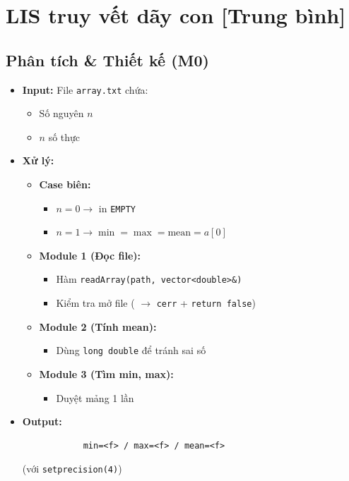 \section{LIS truy vết dãy con [Trung bình]}
\subsection{Phân tích \& Thiết kế (M0)}
    \begin{itemize}
    \item \textbf{Input:}
    File \texttt{array.txt} chứa:
    \begin{itemize}
        \item Số nguyên $n$
        \item $n$ số thực
    \end{itemize}

    \item \textbf{Xử lý:}
        \begin{itemize}
            \item \textbf{Case biên:}
            \begin{itemize}
                \item $n = 0 \rightarrow$ in \texttt{EMPTY}
                \item $n = 1 \rightarrow \min = \max = \text{mean} = a[0]$
            \end{itemize}
            
            \item \textbf{Module 1 (Đọc file):}
            \begin{itemize}
                \item Hàm \texttt{readArray(path, vector<double>\&)}
                \item Kiểm tra mở file ( $\rightarrow$ \texttt{cerr} + \texttt{return false})
            \end{itemize}
            
            \item \textbf{Module 2 (Tính mean):}
            \begin{itemize}
                \item Dùng \texttt{long double} để tránh sai số
            \end{itemize}
            
            \item \textbf{Module 3 (Tìm min, max):}
            \begin{itemize}
                \item Duyệt mảng 1 lần
            \end{itemize}
        \end{itemize}

        \item \textbf{Output:}
        \begin{lstlisting}
            min=<f> / max=<f> / mean=<f>\end{lstlisting} 
        (với \texttt{setprecision(4)})
    \end{itemize}

